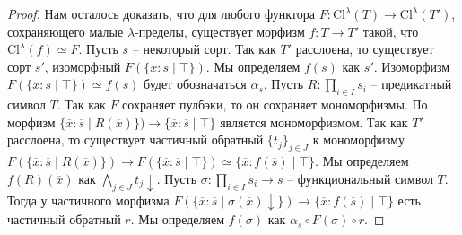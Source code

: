 \documentclass[reqno]{amsart}
\theoremstyle{definition}
\theoremstyle{remark}
\newcommand{\fs}[1]{\mathrm{#1}}
\begin{document}
\begin{proof}
Нам осталось доказать, что для любого функтора $F : \fs{Cl}^\lambda(T) \to \fs{Cl}^\lambda(T')$, сохраняющего малые $\lambda$-пределы, существует морфизм $f : T \to T'$ такой, что $\fs{Cl}^\lambda(f) \simeq F$.
Пусть $s$ -- некоторый сорт.
Так как $T'$ расслоена, то существует сорт $s'$, изоморфный $F(\{ x : s \mid \top \})$.
Мы определяем $f(s)$ как $s'$.
Изоморфизм $F(\{ x : s \mid \top \}) \simeq f(s)$ будет обозначаться $\alpha_s$.
Пусть $R : \prod_{i \in I} s_i$ -- предикатный символ $T$.
Так как $F$ сохраняет пулбэки, то он сохраняет мономорфизмы.
По  морфизм $\{ \overline{x} : \overline{s} \mid R(\overline{x}) \}) \to \{ \overline{x} : \overline{s} \mid \top \}$ является мономорфизмом.
Так как $T'$ расслоена, то существует частичный обратный $\{ t_j \}_{j \in J}$ к мономорфизму $F(\{ \overline{x} : \overline{s} \mid R(\overline{x}) \}) \to F(\{ \overline{x} : \overline{s} \mid \top \}) \simeq \{ \overline{x} : f(\overline{s}) \mid \top \}$.
Мы определяем $f(R)(\overline{x})$ как $\bigwedge_{j \in J} t_j\!\downarrow$.
Пусть $\sigma : \prod_{i \in I} s_i \to s$ -- функциональный символ $T$.
Тогда у частичного морфизма $F(\{ \overline{x} : \overline{s} \mid \sigma(\overline{x})\!\downarrow \}) \to \{ \overline{x} : f(\overline{s}) \mid \top \}$ есть частичный обратный $r$.
Мы определяем $f(\sigma)$ как $\alpha_s \circ F(\sigma) \circ r$.


\end{proof}
\end{document}
